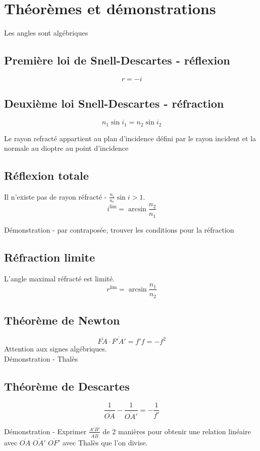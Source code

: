 \documentclass[openany]{book}
\begin{document}
\section{Théorèmes et démonstrations}

Les angles sont algébriques

\subsection{Première loi de Snell-Descartes - réflexion}
\[ r = -i\]

\subsection{Deuxième loi Snell-Descartes - réfraction}
\[ n_1\sin{i_1} = n_2\sin{i_2} \]

\noindent Le rayon refracté appartient au plan d'incidence défini par le rayon incident et la normale au dioptre au point d'incidence

\subsection{Réflexion totale}
Il n'existe pas de rayon réfracté - $ \frac{n_i}{n_r} \sin{i} > 1 $. 
\[i^{\text{lim}} = \arcsin{\frac{n_2}{n_1}} \]

Démonstration - par contraposée, trouver les conditions pour la réfraction

\subsection{Réfraction limite}
L'angle maximal réfracté est limité.
\[r^{\text{lim}} = \arcsin{\frac{n_1}{n_2}} \]

\subsection{Théorème de Newton}
\[\overline{FA} \cdot \overline{F'A'} = f'f=-f^2\]
Attention aux signes algébriques. \\

Démonstration - Thalès

\subsection{Théorème de Descartes} 
\[ \frac{1}{\overline{OA}}-\frac{1}{\overline{OA'}} = -\frac{1}{f'} \]

Démonstration - Exprimer $\frac{\overline{A'B'}}{\overline{AB}}$ de 2 manières pour obtenir une relation linéaire avec $\overline{OA}$ $\overline{OA'}$ $\overline{OF'}$ avec Thalès que l'on divise.
\end{document}

